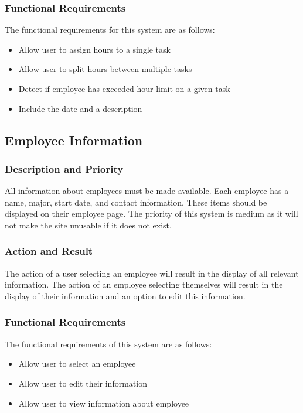 \documentclass[letterpaper,10pt,titlepage,journal,compsoc,draftclsnofoot,onecolumn]{IEEEtran}
\begin{document}
\subsubsection{Functional Requirements}

The functional requirements for this system are as follows:
\begin{itemize}
\item Allow user to assign hours to a single task
\item Allow user to split hours between multiple tasks
\item Detect if employee has exceeded hour limit on a given task
\item Include the date and a description
\end{itemize}

\subsection{Employee Information}

\subsubsection{Description and Priority}

All information about employees must be made available. Each employee has a name, major, start date, and contact information. These items should be displayed on their employee page. The priority of this system is medium as it will not make the site unusable if it does not exist.


\subsubsection{Action and Result}

The action of a user selecting an employee will result in the display of all relevant information. The action of an employee selecting themselves will result in the display of their information and an option to edit this information. 

\subsubsection{Functional Requirements}

The functional requirements of this system are as follows:
\begin{itemize}
\item Allow user to select an employee
\item Allow user to edit their information
\item Allow user to view information about employee
\end{itemize}
\end{document}
